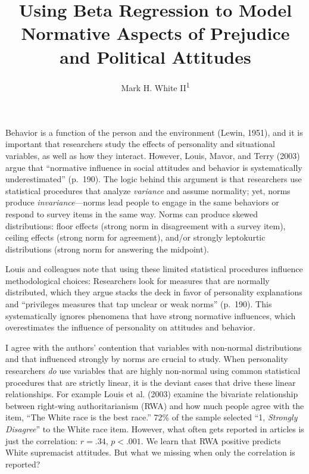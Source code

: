 \documentclass[english,man]{apa6}
\title{Using Beta Regression to Model Normative Aspects of Prejudice and
Political Attitudes}
\author{Mark H. White II\textsuperscript{1}}
\affiliation{
    \vspace{0.5cm}
          \textsuperscript{1} University of Kansas  }
\newcounter{author}
\theoremstyle{definition}
\theoremstyle{definition}
\theoremstyle{remark}
\begin{document}
\maketitle

\setcounter{secnumdepth}{0}



Behavior is a function of the person and the environment (Lewin, 1951),
and it is important that researchers study the effects of personality
and situational variables, as well as how they interact. However, Louis,
Mavor, and Terry (2003) argue that \enquote{normative influence in
social attitudes and behavior is systematically underestimated}
(p.~190). The logic behind this argument is that researchers use
statistical procedures that analyze \emph{variance} and assume
normality; yet, norms produce \emph{invariance}---norms lead people to
engage in the same behaviors or respond to survey items in the same way.
Norms can produce skewed distributions: floor effects (strong norm in
disagreement with a survey item), ceiling effects (strong norm for
agreement), and/or strongly leptokurtic distributions (strong norm for
answering the midpoint).

Louis and colleagues note that using these limited statistical
procedures influence methodological choices: Researchers look for
measures that are normally distributed, which they argue stacks the deck
in favor of personality explanations and \enquote{privileges measures
that tap unclear or weak norms} (p.~190). This systematically ignores
phenomena that have strong normative influences, which overestimates the
influence of personality on attitudes and behavior.

I agree with the authors' contention that variables with non-normal
distributions and that influenced strongly by norms are crucial to
study. When personality researchers \emph{do} use variables that are
highly non-normal using common statistical procedures that are strictly
linear, it is the deviant cases that drive these linear relationships.
For example Louis et al. (2003) examine the bivariate relationship
between right-wing authoritarianism (RWA) and how much people agree with
the item, \enquote{The White race is the best race.} 72\% of the sample
selected \enquote{1, \emph{Strongly Disagree}} to the White race item.
However, what often gets reported in articles is just the correlation:
\(r = .34\), \(p < .001\). We learn that RWA positive predicts White
supremacist attitudes. But what we missing when only the correlation is
reported?
\end{document}
